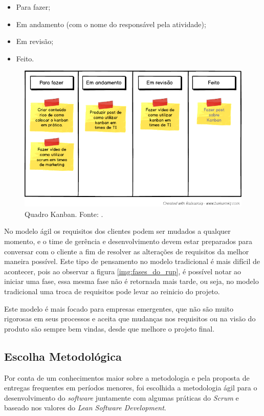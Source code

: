 \begin{itemize}
	\item Para fazer;
	\item Em andamento (com o nome do responsável pela atividade);
	\item Em revisão;
	\item Feito.
\end{itemize}

\begin{figure}[H]
	\centering
	\includegraphics[width=1.0\textwidth]{figuras/kanban.png}
	\caption{Quadro Kanban. Fonte: \cite{kanban}.}
	\label{img:kanban}
\end{figure}

No modelo ágil os requisitos dos clientes podem ser mudados a qualquer momento, e o time de gerência e desenvolvimento devem estar preparados para conversar com o cliente a fim de resolver as alterações de requisitos da melhor maneira possível. Este tipo de pensamento no modelo tradicional é mais difícil de acontecer, pois ao observar a figura \ref{img:fases_do_rup}, é possível notar ao iniciar uma fase, essa mesma fase não é retornada mais tarde, ou seja, no modelo tradicional uma troca de requisitos pode levar ao reinicio do projeto.

Este modelo é mais focado para empresas emergentes, que não são muito rigorosas em seus processos e aceita que mudanças nos requisitos ou na visão do produto são sempre bem vindas, desde que melhore o projeto final.

\subsection{Escolha Metodológica}

Por conta de um conhecimentos maior sobre a metodologia e pela proposta de entregas frequentes em períodos menores, foi escolhida a metodologia ágil para o desenvolvimento do \textit{software} juntamente com algumas práticas do \textit{Scrum} e baseado nos valores do \textit{Lean Software Development}.